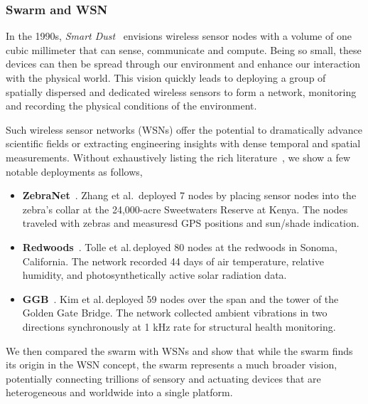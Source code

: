 \subsubsection{Swarm and WSN}
\label{sec:swarm-wsn}

In the 1990s, \textit{Smart Dust}~\cite{kahn1999next} envisions wireless sensor
nodes with a volume of one cubic millimeter that can sense, communicate and
compute. Being so small, these devices can then be spread through our
environment and enhance our interaction with the physical world. This vision
quickly leads to deploying a group of spatially dispersed and dedicated wireless
sensors to form a network, monitoring and recording the physical conditions of
the environment.

Such wireless sensor networks (WSNs) offer the potential to dramatically advance
scientific fields or extracting engineering insights with dense temporal and
spatial measurements. Without exhaustively listing the rich
literature~\cite{akyildiz2002wireless, zhao2009wireless}, we show a few notable
deployments as follows,

\begin{itemize}[itemsep=5pt]
\item \textbf{ZebraNet}~\cite{zhang2005habitat}. Zhang et al.\, deployed 7 nodes
  by placing sensor nodes into the zebra's collar at the 24,000-acre Sweetwaters
  Reserve at Kenya. The nodes traveled with zebras and measuresd GPS positions
  and sun/shade indication.
\item \textbf{Redwoods}~\cite{tolle2005macroscope}. Tolle et al.\,deployed 80
  nodes at the redwoods in Sonoma, California. The network recorded 44 days of
  air temperature, relative humidity, and photosynthetically active solar
  radiation data.
\item \textbf{GGB}~\cite{kim2007health}. Kim et al.\,deployed 59 nodes over the
  span and the tower of the Golden Gate Bridge. The network collected ambient
  vibrations in two directions synchronously at 1 kHz rate for structural health
  monitoring.
\end{itemize}

We then compared the swarm with WSNs and show that while the swarm finds its
origin in the WSN concept, the swarm represents a much broader vision,
potentially connecting trillions of sensory and actuating devices that are
heterogeneous and worldwide into a single platform.

